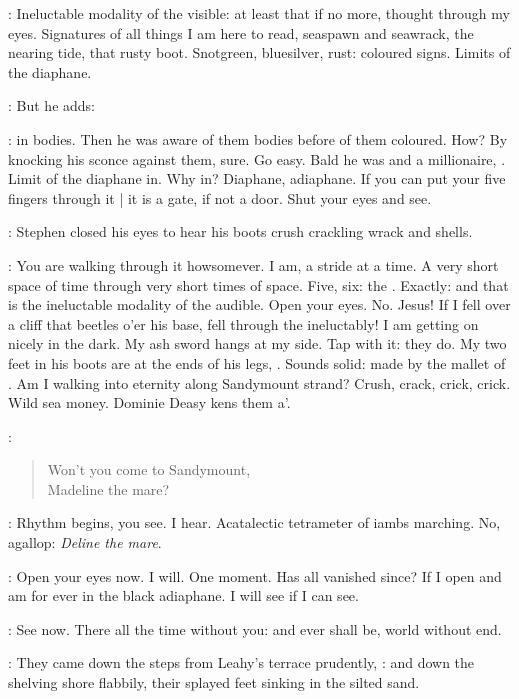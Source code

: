 \StephenInt:
Ineluctable modality of the visible:
at least that if no more, thought through my eyes.
Signatures of all things I am here to read,
seaspawn and seawrack,
the nearing tide,
that rusty boot.
Snotgreen, bluesilver, rust:
coloured signs.
Limits of the diaphane.

:
But he adds:

\StephenInt:
in bodies.
Then he was aware of them bodies before of them coloured.
How?
By knocking his sconce against them, sure.
Go easy.
Bald he was and a millionaire,
.
Limit of the diaphane in.
Why in?
Diaphane, adiaphane.
If you can put your five fingers through it |
it is a gate,
if not a door.
Shut your eyes and see.

:
Stephen closed his eyes to hear his boots
crush crackling wrack and shells.

\StephenInt:
You are walking through it howsomever.
I am, a stride at a time.
A very short space of time through very short times of space.
Five, six: the .
Exactly: and that is the ineluctable modality of the audible.
Open your eyes.
No.
Jesus!
If I fell over a cliff that beetles o'er his base,
fell through the  ineluctably!
I am getting on nicely in the dark.
My ash sword hangs at my side.
Tap with it: they do.
My two feet in his boots are at the ends of his legs, .
Sounds solid:
made by the mallet of .
Am I walking into eternity along Sandymount strand?
Crush, crack, crick, crick.
Wild sea money.
Dominie Deasy kens
them a'.

:
\begin{verse}
    Won't you come to Sandymount, \\
    Madeline the mare?
\end{verse}

\StephenInt:
Rhythm begins, you see.
I hear.
Acatalectic tetrameter of iambs marching.
No, agallop:
\emph{Deline the mare}.

\StephenInt:
Open your eyes now.
I will.
One moment.
Has all vanished since?
If I open and am for ever in the black adiaphane.
I will see if I can see.

\StephenInt:
See now.
There all the time without you:
and ever shall be,
world without end.

:
They came down the steps from Leahy's terrace prudently,
:
and down the shelving shore flabbily,
their splayed feet sinking in the silted sand.

